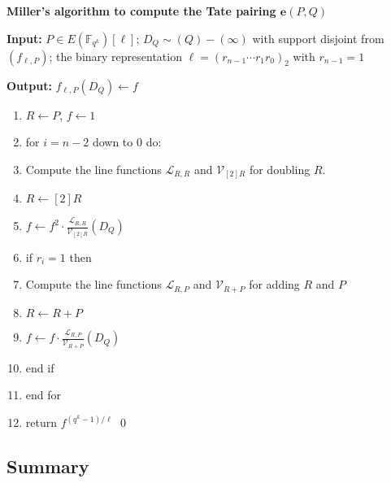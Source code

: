 \documentclass[11pt, lettersize, notitlepage, leqno, footskip=0.6cm]{article}
\newcommand{\bFqk}{\mathbb{F}_{q^k}}
\newcommand{\mc}{\mathcal}
\newcommand{\e}{\mathbf{e}}
\newcommand{\vs}{\vspace{-0.15cm}}
\newcommand{\noin}{\noindent}
\numberwithin{equation}{section}
\begin{document}
\begin{mdframed} \textbf{Miller's algorithm to compute  the Tate pairing $\e(P,Q)$} \vspace{0.15cm}

\noin \textbf{Input:} $P\in E(\bFqk)[\ell]$; $D_Q\sim (Q)-(\infty)$ with support disjoint from $(f_{\ell,P})$; the binary representation $\ell = (r_{n-1}\cdots r_1 r_0)_2$ with $r_{n-1} = 1$ \vspace{0.15cm}

\noin \textbf{Output:} $f_{\ell,P}(D_Q)\gets f$ \vspace{0.15cm}

\begin{enumerate}[wide, labelwidth=!, labelindent=0pt]\vs \item $R\gets P$, $f\gets 1$

\item for $i = n-2$ down to $0$ do:

\item Compute the line functions $\mc{L}_{R,R}$ and $\mc{V}_{[2]R}$ for doubling $R$.

\item $R\gets [2]R$

\item $f\gets f^2\cdot \frac{\mc{L}_{R,R}}{\mc{V}_{[2]R}}(D_Q)$

\item if $r_i =1$ then 

\item Compute the line functions $\mc{L}_{R,P}$ and $\mc{V}_{R+P}$ for adding $R$ and $P$

\item $R\gets R+P$

\item $f\gets f\cdot \frac{\mc{L}_{R,P}}{\mc{V}_{R+P}}(D_Q)$

\item end if

\item end for

\item return $f^{(q^k-1)/{\ell}}$ \qed \end{enumerate} \end{mdframed}






\subsection{\fontsize{11}{11}\selectfont Summary}
\end{document}
